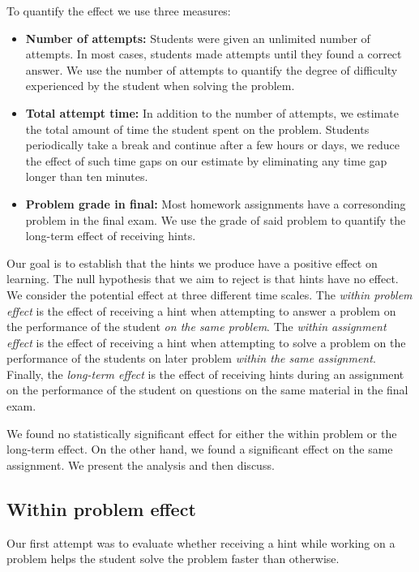 \documentclass{sigchi/sigchi}
\begin{document}
To quantify the effect we use three measures:
\begin{itemize}
\item {\bf Number of attempts:} Students were given an unlimited number of attempts. In most cases, students made attempts until they found a correct answer. We use the number of attempts to quantify the degree of difficulty experienced by the student when solving the problem.

\item {\bf Total attempt time:} In addition to the number of attempts, we estimate the total amount of time the student spent on the problem. Students periodically take a break and continue after a few hours or days, we reduce the effect of such time gaps on our estimate by eliminating any time gap longer than ten minutes.
\item {\bf Problem grade in final:} Most homework assignments have a corresonding problem in the final exam. We use the grade of said problem to quantify the long-term effect of receiving hints. 
\end{itemize}

Our goal is to establish that the hints we produce have a positive
effect on learning. The null hypothesis that we aim to reject is that
hints have no effect. We consider the potential effect at three
different time scales. The {\em within problem effect} is the effect
of receiving a hint when attempting to answer a problem on the
performance of the student {\em on the same problem}. The {\em within
  assignment effect} is the effect of receiving a hint when attempting
to solve a problem on the performance of the students on later problem
{\em within the same assignment}. Finally, the {\em long-term effect}
is the effect of receiving hints during an assignment on the
performance of the student on questions on the same material in the
final exam.

We found no statistically significant effect for either the within problem or
the long-term effect. On the other hand, we found a significant effect
on the same assignment. We present the analysis and then discuss.

\subsection{Within problem effect}

Our first attempt was to evaluate whether receiving a hint while
working on a problem helps the student solve the problem faster than
otherwise.
\end{document}

